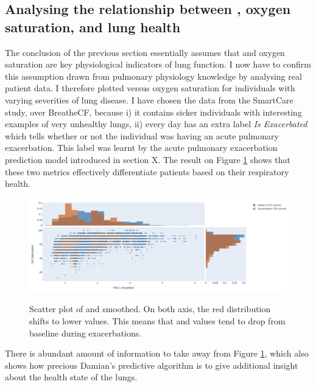 \subsection{Analysing the relationship between \F, oxygen saturation, and lung health}
The conclusion of the previous section essentially assumes that \F and oxygen saturation are key physiological indicators of lung function. I now have to confirm this assumption drawn from pulmonary physiology knowledge by analysing real patient data. I therefore plotted \F versus oxygen saturation for individuals with varying severities of lung disease. I have chosen the data from the SmartCare study, over BreatheCF, because i) it contains sicker individuals with interesting examples of very unhealthy lungs, ii) every day has an extra label \textit{Is Exacerbated} which tells whether or not the individual was having an acute pulmonary exacerbation. This label was learnt by the acute pulmonary exacerbation prediction model introduced in section X. The result on Figure \ref{fig:o2_fev1_exacerbated} shows that these two metrics effectively differentiate patients based on their respiratory health. 

\begin{figure}[!h]
    \caption{Scatter plot of \OXSat and \F smoothed. On both axis, the red distribution shifts to lower values. This means that \OXSat and \F values tend to drop from baseline during exacerbations.}
    \centering
    \includegraphics[width=150mm]{Chapter1/Figs/o2_fev1_with_exacerbated_labels.png}
    \label{fig:o2_fev1_exacerbated}
\end{figure}

There is abundant amount of information to take away from Figure \ref{fig:o2_fev1_exacerbated}, which also shows how precious Damian's predictive algorithm is to give additional insight about the health state of the lungs.

